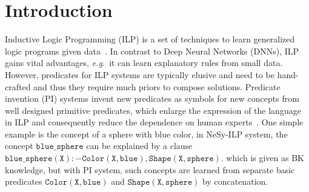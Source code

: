 \documentclass[
]{ceurart}
\newcommand{\eg}{\emph{e.g.}~}
\begin{document}
	\section{Introduction}
	
	
	
	Inductive Logic Programming (ILP) is a set of techniques to learn generalized logic programs given data~\cite{Muggleton91,Nienhuys97,Cropper20}.
	In contrast to Deep Neural Networks (DNNs), ILP gains vital advantages, \eg it can learn explanatory rules from small data.
	However, predicates for ILP systems are typically elusive and need to be hand-crafted and thus they require much priors to compose solutions.
	Predicate invention (PI) systems invent new predicates as symbols for new concepts from well designed primitive predicates, which enlarge the expression of the language in ILP and consequently reduce the dependence on human experts~\cite{pi1988}. 
	One simple example is the concept of a sphere with blue color, in NeSy-ILP system, the concept $ \mathtt{blue\_sphere} $ can be explained by a clause $\mathtt{blue\_sphere(X):-Color(X,blue),Shape(X,sphere).} $ which is given as BK knowledge, but with PI system, such concepts are learned from separate basic predicates $ \mathtt{Color(X,blue)} $ and $ \mathtt{Shape(X,sphere)} $ by concatenation. 
	
	
	
	
	
\end{document}
